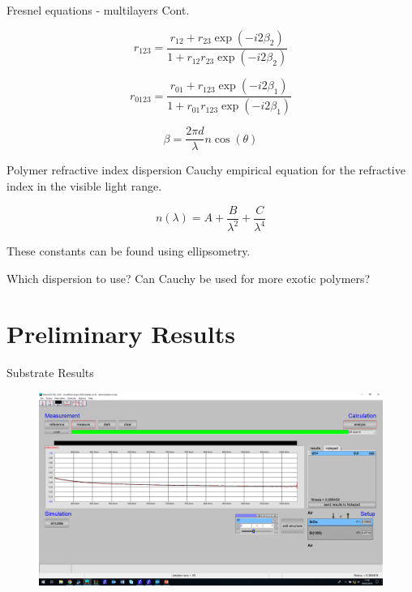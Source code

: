 \documentclass[10pt]{beamer}
\begin{document}
	\begin{frame}{Fresnel equations - multilayers Cont.}
	
	\begin{minipage}{0.47\textwidth}
	\begin{equation*}
	r_{123}= \frac{r_{12}+r_{23}\exp(-i2\beta_2)}{1+r_{12}r_{23}\exp(-i2\beta_2)}
	\end{equation*}
	
	\begin{equation*}
	r_{0123}= \frac{r_{01}+r_{123}\exp(-i2\beta_1)}{1+r_{01}r_{123}\exp(-i2\beta_1)}
	\end{equation*}
	\end{minipage}
	\begin{minipage}{0.5\textwidth}
		\begin{equation*}
		\beta=\frac{2\pi d}{\lambda} n\cos(\theta)
		\end{equation*}
	\end{minipage}
	\end{frame}
	
	\begin{frame}{Polymer refractive index dispersion}
	Cauchy empirical equation for the refractive index in the visible light range.
	
	\begin{equation*}
	n(\lambda) = A + \frac{B}{\lambda^2} + \frac{C}{\lambda^4}
	\end{equation*}
	
	These constants can be found using ellipsometry.
	
	Which dispersion to use? Can Cauchy be used for more exotic polymers?   
	\end{frame}
	
	\section{Preliminary Results}
	
	\begin{frame}{Substrate Results}
		\begin{figure}
		\centering
		\includegraphics[width=\textwidth]{sub1.png}
		\end{figure}
		\end{frame}
		
\end{document}
